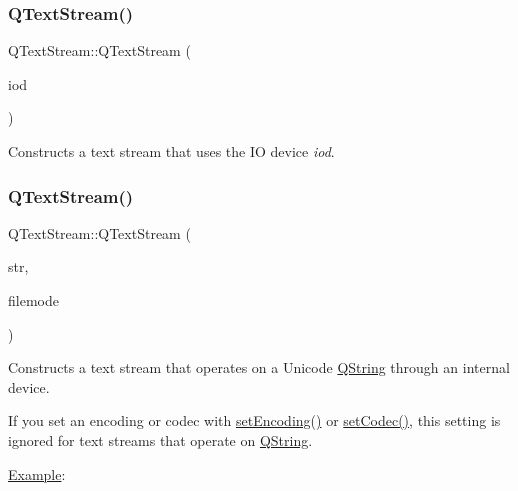 \subsubsection{\texorpdfstring{QTextStream()}{QTextStream()}\hspace{0.1cm}{\footnotesize\ttfamily [2/6]}}
{\footnotesize\ttfamily Q\+Text\+Stream\+::\+Q\+Text\+Stream (\begin{DoxyParamCaption}\item[{\mbox{\hyperlink{class_q_i_o_device}{Q\+I\+O\+Device}} $\ast$}]{iod }\end{DoxyParamCaption})}

Constructs a text stream that uses the IO device {\itshape iod}. \mbox{\label{class_q_text_stream_a7abe6ca8fe34120632550a88c6f67cc5}} 
\subsubsection{\texorpdfstring{QTextStream()}{QTextStream()}\hspace{0.1cm}{\footnotesize\ttfamily [3/6]}}
{\footnotesize\ttfamily Q\+Text\+Stream\+::\+Q\+Text\+Stream (\begin{DoxyParamCaption}\item[{\mbox{\hyperlink{class_q_string}{Q\+String}} $\ast$}]{str,  }\item[{int}]{filemode }\end{DoxyParamCaption})}

Constructs a text stream that operates on a Unicode \mbox{\hyperlink{class_q_string}{Q\+String}} through an internal device.

If you set an encoding or codec with \mbox{\hyperlink{class_q_text_stream_ad06dc1f99476aed01fa8a822e871dc44}{set\+Encoding()}} or \mbox{\hyperlink{class_q_text_stream_a18bdd4ae41cd9b37ec06827658fbf447}{set\+Codec()}}, this setting is ignored for text streams that operate on \mbox{\hyperlink{class_q_string}{Q\+String}}.

\mbox{\hyperlink{struct_example}{Example}}\+: 
\begin{DoxyCode}{0}
\end{DoxyCode}


